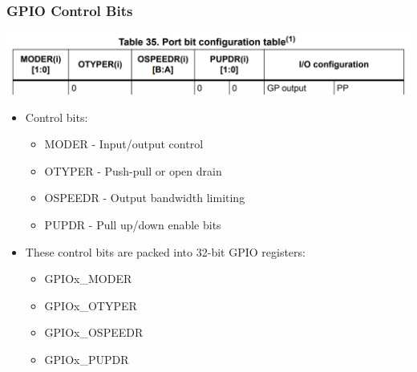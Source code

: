 \documentclass[14pt]{beamer}
\begin{document}
\begin{frame}[fragile]
\frametitle{GPIO Control Bits}
\begin{center}
\includegraphics[width=0.9\framewidth]{gpioBits}
\end{center}
\begin{itemize}
\item Control bits:
	\begin{itemize}
		\item MODER - Input/output control
		\item OTYPER - Push-pull or open drain
		\item OSPEEDR - Output bandwidth limiting
		\item PUPDR - Pull up/down enable bits
	\end{itemize}
\item These control bits are packed into 32-bit GPIO registers:
	\begin{itemize}
		\item GPIOx\_MODER
		\item GPIOx\_OTYPER
		\item GPIOx\_OSPEEDR
		\item GPIOx\_PUPDR
	\end{itemize}
\end{itemize}
\end{frame}
\end{document}
